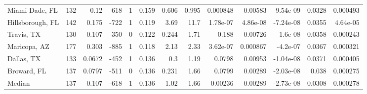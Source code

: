 \documentclass[12pt,letterpaper]{article}
\begin{document}
\begin{sidewaystable}
{\begin{tabular}{lrrrrrrrrrrrr}
 Miami-Dade, FL    &   132 &  0.12   &  -618 &     1 &           0.159 &            0.606 &          0.995 &     0.000848 &     0.00583  &        -9.54e-09 &           0.0328  &        0.000493 \\
 Hillsborough, FL  &   142 &  0.175  &  -722 &     1 &           0.119 &            3.69  &         11.7   &     1.78e-07 &     4.86e-08 &        -7.24e-08 &           0.0355  &        4.64e-05 \\
 Travis, TX        &   130 &  0.107  &  -350 &     0 &           0.122 &            0.244 &          1.71  &     0.188    &     0.00726  &        -1.6e-08  &           0.0358  &        0.000243 \\
 Maricopa, AZ      &   177 &  0.303  &  -885 &     1 &           0.118 &            2.13  &          2.33  &     3.62e-07 &     0.000867 &        -4.2e-07  &           0.0367  &        0.000321 \\
 Dallas, TX        &   133 &  0.0672 &  -452 &     1 &           0.136 &            0.3   &          1.19  &     0.0798   &     0.00953  &        -1.04e-08 &           0.0371  &        0.000405 \\
 Broward, FL       &   137 &  0.0797 &  -511 &     0 &           0.136 &            0.231 &          1.66  &     0.0799   &     0.00289  &        -2.03e-08 &           0.038   &        0.000275 \\
\hline
 Median            &   137 &  0.107  &  -618 &     1 &           0.136 &            1.02  &          1.66  &     0.00236  &     0.00289  &        -2.73e-08 &           0.0308  &        0.000278 \\
\hline
\end{tabular}


}\end{sidewaystable}
\end{document}
